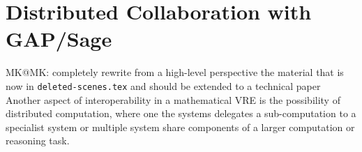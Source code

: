 \section{Distributed Collaboration with GAP/Sage}\label{sec:gapsage}
\begin{newpart}{MK@MK: completely rewrite from a high-level perspective the material that
    is now in \texttt{deleted-scenes.tex} and should be extended to a technical paper}
Another aspect of interoperability in a mathematical VRE is the possibility of distributed
computation, where one the systems delegates a sub-computation to a specialist system or
multiple system share components of a larger computation or reasoning task.


\end{newpart}
